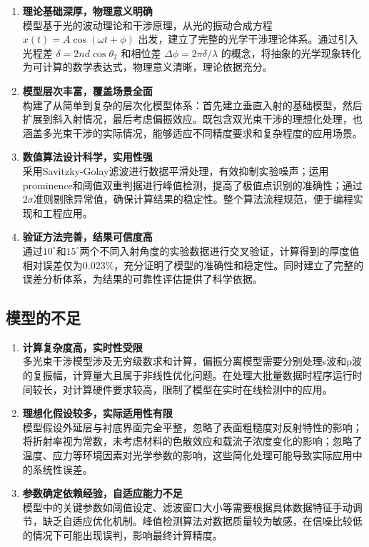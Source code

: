 \documentclass[withoutpreface,bwprint]{cumcmthesis} %
\begin{document}
\begin{enumerate}
    \item \textbf{理论基础深厚，物理意义明确}\\
          模型基于光的波动理论和干涉原理，从光的振动合成方程 $x(t) = A \cos(\omega t + \phi)$ 出发，建立了完整的光学干涉理论体系。通过引入光程差 $\delta = 2nd \cos\theta_2$ 和相位差 $\Delta\phi = 2\pi\delta/\lambda$ 的概念，将抽象的光学现象转化为可计算的数学表达式，物理意义清晰，理论依据充分。

    \item \textbf{模型层次丰富，覆盖场景全面}\\
          构建了从简单到复杂的层次化模型体系：首先建立垂直入射的基础模型，然后扩展到斜入射情况，最后考虑偏振效应。既包含双光束干涉的理想化处理，也涵盖多光束干涉的实际情况，能够适应不同精度要求和复杂程度的应用场景。

    \item \textbf{数值算法设计科学，实用性强}\\
          采用Savitzky-Golay滤波进行数据平滑处理，有效抑制实验噪声；运用prominence和阈值双重判据进行峰值检测，提高了极值点识别的准确性；通过$2\sigma$准则剔除异常值，确保计算结果的稳定性。整个算法流程规范，便于编程实现和工程应用。

    \item \textbf{验证方法完善，结果可信度高}\\
          通过$10^\circ$和$15^\circ$两个不同入射角度的实验数据进行交叉验证，计算得到的厚度值相对误差仅为0.023\%，充分证明了模型的准确性和稳定性。同时建立了完整的误差分析体系，为结果的可靠性评估提供了科学依据。
\end{enumerate}

\subsection{模型的不足}

\begin{enumerate}
    \item \textbf{计算复杂度高，实时性受限}\\
          多光束干涉模型涉及无穷级数求和计算，偏振分离模型需要分别处理s波和p波的复振幅，计算量大且属于非线性优化问题。在处理大批量数据时程序运行时间较长，对计算硬件要求较高，限制了模型在实时在线检测中的应用。

    \item \textbf{理想化假设较多，实际适用性有限}\\
          模型假设外延层与衬底界面完全平整，忽略了表面粗糙度对反射特性的影响；将折射率视为常数，未考虑材料的色散效应和载流子浓度变化的影响；忽略了温度、应力等环境因素对光学参数的影响，这些简化处理可能导致实际应用中的系统性误差。

    \item \textbf{参数确定依赖经验，自适应能力不足}\\
          模型中的关键参数如阈值设定、滤波窗口大小等需要根据具体数据特征手动调节，缺乏自适应优化机制。峰值检测算法对数据质量较为敏感，在信噪比较低的情况下可能出现误判，影响最终计算精度。
\end{enumerate}
\end{document}
